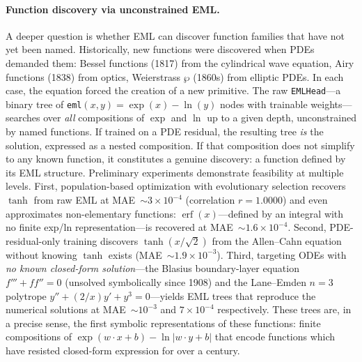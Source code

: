 \paragraph{Function discovery via unconstrained EML.}
A deeper question is whether EML can discover function families that have not
yet been named.  Historically, new functions were discovered when PDEs demanded
them: Bessel functions (1817) from the cylindrical wave equation, Airy functions
(1838) from optics, Weierstrass $\wp$ (1860s) from elliptic PDEs.  In each
case, the equation forced the creation of a new primitive.  The raw
\texttt{EMLHead}---a binary tree of \texttt{eml}$(x,y) = \exp(x) - \ln(y)$
nodes with trainable weights---searches over \emph{all} compositions of $\exp$
and $\ln$ up to a given depth, unconstrained by named functions.  If trained on
a PDE residual, the resulting tree \emph{is} the solution, expressed as a nested
composition.  If that composition does not simplify to any known function, it
constitutes a genuine discovery: a function defined by its EML structure.
Preliminary experiments demonstrate feasibility at multiple levels.  First,
population-based optimization with evolutionary selection recovers $\tanh$ from
raw EML at MAE~$\sim 3\!\times\!10^{-4}$ (correlation $r = 1.0000$) and
even approximates non-elementary functions: $\operatorname{erf}(x)$---defined
by an integral with no finite exp/ln representation---is recovered at
MAE~$\sim 1.6\!\times\!10^{-4}$.  Second, PDE-residual-only training
discovers $\tanh(x/\sqrt{2})$ from the Allen--Cahn equation without
knowing $\tanh$ exists (MAE~$\sim 1.9\!\times\!10^{-3}$).  Third, targeting
ODEs with \emph{no known closed-form solution}---the Blasius boundary-layer
equation $f''' + ff'' = 0$ (unsolved symbolically since 1908) and the
Lane--Emden $n\!=\!3$ polytrope $y'' + (2/x)y' + y^{3} = 0$---yields EML
trees that reproduce the numerical solutions at MAE~$\sim 10^{-3}$ and
$7\!\times\!10^{-4}$ respectively.  These trees are, in a precise sense,
the first symbolic representations of these functions: finite compositions of
$\exp(w \cdot x + b) - \ln|w \cdot y + b|$ that encode functions which have
resisted closed-form expression for over a century.

